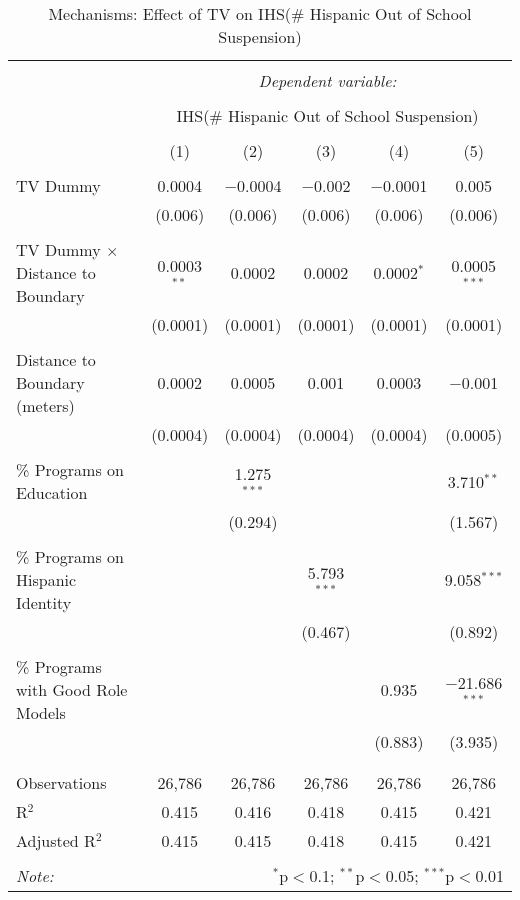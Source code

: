 
\begin{table}[!htbp] \centering 
  \caption{Mechanisms: Effect of TV on IHS(\# Hispanic Out of School Suspension)} 
  \label{} 
\begin{tabular}{@{\extracolsep{-2pt}}lccccc} 
\\[-1.8ex]\hline 
\hline \\[-1.8ex] 
 & \multicolumn{5}{c}{\textit{Dependent variable:}} \\ 
\cline{2-6} 
\\[-1.8ex] & \multicolumn{5}{c}{IHS(\# Hispanic Out of School Suspension)} \\ 
\\[-1.8ex] & (1) & (2) & (3) & (4) & (5)\\ 
\hline \\[-1.8ex] 
 TV Dummy & 0.0004 & $-$0.0004 & $-$0.002 & $-$0.0001 & 0.005 \\ 
  & (0.006) & (0.006) & (0.006) & (0.006) & (0.006) \\ 
  & & & & & \\ 
 TV Dummy $\times$ Distance to Boundary & 0.0003$^{**}$ & 0.0002 & 0.0002 & 0.0002$^{*}$ & 0.0005$^{***}$ \\ 
  & (0.0001) & (0.0001) & (0.0001) & (0.0001) & (0.0001) \\ 
  & & & & & \\ 
 Distance to Boundary (meters) & 0.0002 & 0.0005 & 0.001 & 0.0003 & $-$0.001 \\ 
  & (0.0004) & (0.0004) & (0.0004) & (0.0004) & (0.0005) \\ 
  & & & & & \\ 
 \% Programs on Education &  & 1.275$^{***}$ &  &  & 3.710$^{**}$ \\ 
  &  & (0.294) &  &  & (1.567) \\ 
  & & & & & \\ 
 \% Programs on Hispanic Identity &  &  & 5.793$^{***}$ &  & 9.058$^{***}$ \\ 
  &  &  & (0.467) &  & (0.892) \\ 
  & & & & & \\ 
 \% Programs with Good Role Models &  &  &  & 0.935 & $-$21.686$^{***}$ \\ 
  &  &  &  & (0.883) & (3.935) \\ 
  & & & & & \\ 
\hline \\[-1.8ex] 
Observations & 26,786 & 26,786 & 26,786 & 26,786 & 26,786 \\ 
R$^{2}$ & 0.415 & 0.416 & 0.418 & 0.415 & 0.421 \\ 
Adjusted R$^{2}$ & 0.415 & 0.415 & 0.418 & 0.415 & 0.421 \\ 
\hline 
\hline \\[-1.8ex] 
\textit{Note:}  & \multicolumn{5}{r}{$^{*}$p$<$0.1; $^{**}$p$<$0.05; $^{***}$p$<$0.01} \\ 
\end{tabular} 
\end{table} 
